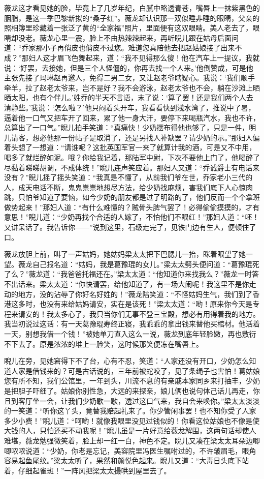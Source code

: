 \par 薇龙这才看见她的脸，毕竟上了几岁年纪，白腻中略透青苍，嘴唇上一抹紫黑色的胭脂，是这一季巴黎新拟的“桑子红”。薇龙却认识那一双似睡非睡的眼睛，父亲的照相簿里珍藏着一张泛了黄的“全家福”照片，里面便有这双眼睛。美人老去了，眼睛却没老。薇龙心里一震，脸上不由热辣辣起来，再听睨儿跟在姑母后面问道：“乔家那小子再俏皮也俏皮不过您。难道您真陪他去把赵姑娘接了出来不成？”那妇人这才眉飞色舞起来，道：“我不见得那么傻！他在汽车上一提议，我就说：‘好罢，去接她，但是三个人怪僵的，你再去找一个人来。’他倒赞成，可是他主张先接了玛琳赵再邀人，免得二男二女，又让赵老爷瞎疑心。我说：‘我们顺手牵羊，拉了赵老太爷来，岂不是好？我不会游泳，赵老太爷也不会，躺在沙滩上晒晒太阳，也有个伴儿。’姓乔的半天不言语，末了说：‘算了罢！还是我们两个人去清静些。’我说：‘怎么啦？’他只闷着头开车，我看看快到浅水湾了，推说中了暑，逼着他一口气又把车开了回来，累了他一身大汗，要停下来喝瓶汽水，我也不许，总算出了一口气。”睨儿拍手笑道：“真痛快！少奶摆布得他也够了，只是一件，明儿请客，想必他那一份帖子是取消了，还是另找人补缺罢？请少奶的示。”那妇人偏着头想了一想道：“请谁呢？这批英国军官一来了就算计我的酒，可是又不中用，喝多了就烂醉如泥。哦？你给我记着，那陆军中尉，下次不要他上门了，他喝醉了尽黏着睇睇胡调，不成体统！”睨儿连声笑应着。那妇人又道：“乔诚爵士有电话来没有？”睨儿摇了摇头笑道：“我真是不懂了，从前我们爷在世，乔家老小三代的人，成天电话不断，鬼鬼祟祟地想尽方法，给少奶找麻烦，害我们底下人心惊肉跳，只怕爷知道了要恼，如今少奶的朋友都是过了明路的了，他们反而一个个拿班做势起来！”那妇人道：“有什么难懂的？贼骨头脾气罢了！必得偷偷摸摸的，才有意思！”睨儿道：“少奶再找个合适的人嫁了，不怕他们不眼红！”那妇人道：“呸！又讲呆话了。我告诉你——”说到这里，石级走完了，见铁门边有生人，便顿住了口。
\par 薇龙放胆上前，叫了一声姑妈，她姑妈梁太太把下巴腮儿一抬，眯着眼望了她一望。薇龙自己报名道：“姑妈，我是葛豫琨的女儿。”梁太太劈头便问道：“葛豫琨死了么？”薇龙道：“我爸爸托福还在。”梁太太道：“他知道你来找我么？”薇龙一时答不出话来。梁太太道：“你快请罢，给他知道了，有一场大闹呢！我这里不是你走动的地方，没的沾辱了你好名好姓的！”薇龙陪笑道：“不怪姑妈生气，我们到了香港这多时，也没有来给姑妈请安，实在是该死！”梁太太道：“哟！原来你今天是专程来请安的！我太多心了，我只当你们无事不登三宝殿，想必有用得着我的地方。我当初说过这话：有一天葛豫琨寿终正寝，我乖乖的拿出钱来替他买棺材。他活着一天，别想我借一个钱！”被她单刀直入这么一说，薇龙到底年轻脸嫩，再也敷衍不下去了。原是浓浓的堆上一脸笑，这时候那笑便冻在嘴唇上。
\par 睨儿在旁，见她窘得下不了台，心有不忍，笑道：“人家还没有开口，少奶怎么知道人家是借钱来的？可是古话说的，三年前被蛇咬了，见了条绳子也害怕！葛姑娘您有所不知，我们公馆里，一年到头，川流不息的有亲戚本家同乡来打抽丰，少奶是把胆子吓细了。姑娘你别性急，大远的来探亲，娘儿俩也说句体己话儿再走，你且到客厅坐一会，让我们少奶歇一歇，透过这口气来，我自会来唤你。”梁太太淡淡的一笑道：“听你这丫头，竟替我赔起礼来了。你少管闲事罢！也不知你受了人家多少小费！”睨儿道：“呵哟！就像我眼里没见过钱似的！你看这位姑娘也不像是使大钱的人，只怕还买不动我呢！”睨儿虽是一片好意给薇龙解围，这两句话却使人难堪，薇龙勉强微笑着，脸上却一红一白，神色不定。睨儿又凑在梁太太耳朵边唧唧哝哝说道：“少奶，你老是忘记，美容院里冯医生嘱咐过的，不许皱眉毛，眼角容易起鱼尾纹。”梁太太听了，果然和颜悦色起来。睨儿又道：“大毒日头底下站着，仔细起雀斑！”一阵风把梁太太撮哄到屋里去了。
